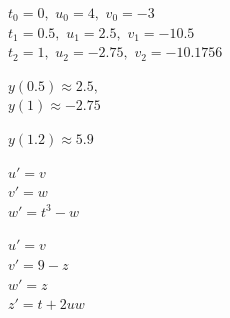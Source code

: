 { \item  $t_0 = 0,$ \hspace{0.5cm} $u_0 = 4,$\hspace{0.5cm} $v_0 = -3$\\
  $t_1 = 0.5,$ \hspace{0.5cm} $u_1 = 2.5,$\hspace{0.5cm} $v_1 = -10.5$\\
  $t_2 = 1,$ \hspace{0.5cm} $u_2 = -2.75,$\hspace{0.5cm} $v_2 = -10.1756$\\

 \item  $y(0.5) \approx 2.5,$\\
  $y(1) \approx -2.75$\\
 \een

\item  $y(1.2) \approx 5.9$\\

\item  \ben
 \item  $u' = v$\\
  $v' = w$\\
  $w' = t^3 - w$\\

 \item  $u' = v$\\
  $v' = 9 - z$\\
  $w' = z$\\
  $z' = t + 2uw$\\
 \een
\een

}
